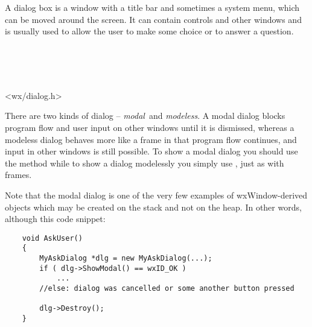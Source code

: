 
\section{}\label{wxdialog}

A dialog box is a window with a title bar and sometimes a system menu, which
can be moved around the screen. It can contain controls and other windows and
is usually used to allow the user to make some choice or to answer a question.


\\
\\
\\


<wx/dialog.h>


There are two kinds of dialog -- {\it modal}\ and {\it modeless}. A modal dialog
blocks program flow and user input on other windows until it is dismissed,
whereas a modeless dialog behaves more like a frame in that program flow
continues, and input in other windows is still possible. To show a modal dialog
you should use the  method while to show
a dialog modelessly you simply use , just as with
frames.

Note that the modal dialog is one of the very few examples of
wxWindow-derived objects which may be created on the stack and not on the heap.
In other words, although this code snippet:

\begin{verbatim}
    void AskUser()
    {
        MyAskDialog *dlg = new MyAskDialog(...);
        if ( dlg->ShowModal() == wxID_OK )
            ...
        //else: dialog was cancelled or some another button pressed

        dlg->Destroy();
    }
\end{verbatim}

